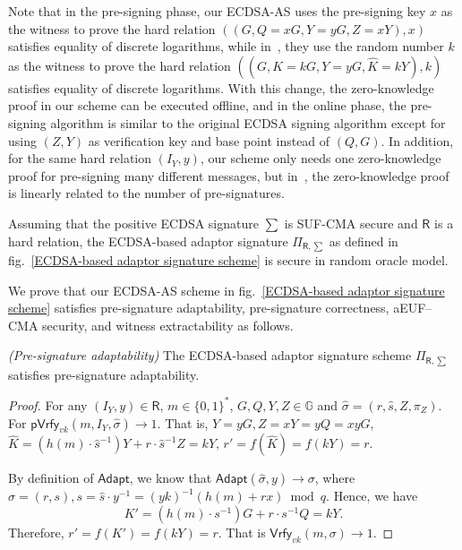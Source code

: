 \documentclass{llncs}
\begin{document}
Note that in the pre-signing phase, our ECDSA-AS uses the pre-signing key $x$ as the witness to prove the hard relation $((G, Q=xG, Y=yG, Z=xY), x)$ satisfies equality of discrete logarithms, while in~\cite{AumayrEEFHMMR20}, they use the random number $k$ as the witness to prove the hard relation $((G, K=kG, Y=yG, \hat{K}=kY), k)$ satisfies equality of discrete logarithms. With this change, the zero-knowledge proof in our scheme can be executed offline, and in the online phase, the pre-signing algorithm is similar to the original ECDSA signing algorithm except for using $(Z, Y)$ as verification key and base point instead of $(Q, G)$. In addition, for the same hard relation $(I_Y,y)$, our scheme only needs one zero-knowledge proof for pre-signing many different messages, but in~\cite{AumayrEEFHMMR20}, the zero-knowledge proof is linearly related to the number of pre-signatures.

\begin{theorem}
Assuming that the positive ECDSA signature $\sum$ is SUF-CMA secure and $\mathsf{R}$ is a hard relation, the ECDSA-based adaptor signature $\Pi_{\mathsf{R},\sum}$ as defined in fig.~\ref{ECDSA-based adaptor signature scheme} is secure in random oracle model.
\end{theorem}

We prove that our ECDSA-AS scheme in fig.~\ref{ECDSA-based adaptor signature scheme} satisfies pre-signature adaptability, pre-signature correctness, aEUF–CMA security, and witness extractability as follows. 

\begin{lemma}\emph{(Pre-signature adaptability)}\label{Pre-signature adaptability} 
The ECDSA-based adaptor signature scheme $\Pi_{\mathsf{R},\sum}$ satisfies pre-signature adaptability.
\end{lemma}

\begin{proof}
For any $(I_Y,y)\in \mathsf{R}$, $m\in \{0,1\}^*$, $G,Q,Y,Z\in \mathbb{G}$ and $\hat{\sigma} = (r,\hat{s},Z,\pi_Z)$. For $\mathsf{pVrfy}_{vk}(m,I_Y,\hat{\sigma})\rightarrow 1$. That is, $Y=yG,Z=xY=yQ=xyG$, $\hat{K}=(h(m)\cdot\hat{s}^{-1})Y+r\cdot\hat{s}^{-1}Z=kY$, $r'=f(\hat{K})=f(kY)=r$. 

By definition of $\mathsf{Adapt}$, we know that $\mathsf{Adapt}(\hat{\sigma}, y)\rightarrow \sigma$, where $\sigma=(r,s), s = \hat{s}\cdot y^{-1} = (yk)^{-1}(h(m)+rx)\bmod q$. Hence, we have 
$$K'=(h(m)\cdot s^{-1})G+r\cdot s^{-1}Q=kY.$$ 
Therefore, $r'=f(K')=f(kY)=r$. That is $\mathsf{Vrfy}_{vk}(m,\sigma)\rightarrow 1$.
\end{proof}
\end{document}
